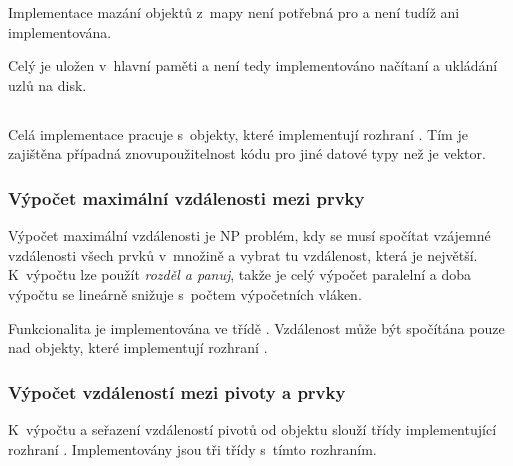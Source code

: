 Implementace mazání objektů z~mapy není potřebná pro \MIndex{} a není tudíž ani implementována.

Celý \BPTree{} je uložen v~hlavní paměti a není tedy implementováno načítaní a ukládání uzlů na disk.

\subsection{\MIndex{}}
Celá implementace \MIndex{} pracuje s~objekty, které implementují rozhraní . Tím je zajištěna případná znovupoužitelnost kódu pro jiné datové typy než je vektor.

\subsubsection{Výpočet maximální vzdálenosti mezi prvky}
Výpočet maximální vzdálenosti je NP problém, kdy se musí spočítat vzájemné vzdálenosti všech prvků v~množině a vybrat tu vzdálenost, která je největší. K~výpočtu lze použít \emph{rozděl a panuj}, takže je celý výpočet paralelní a doba výpočtu se lineárně snižuje s~počtem výpočetních vláken.

Funkcionalita je implementována ve třídě \linebreak {}.
Vzdálenost může být spočítána pouze nad objekty, které implementují rozhraní .


\subsubsection{Výpočet vzdáleností mezi pivoty a prvky}
K~výpočtu a seřazení vzdáleností pivotů od objektu slouží třídy implementující rozhraní . Implementovány jsou tři třídy s~tímto rozhraním.

